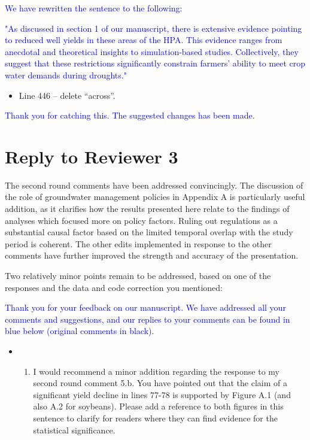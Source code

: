 \documentclass[
]{article}
\providecommand{\tightlist}{%
  \setlength{\itemsep}{0pt}\setlength{\parskip}{0pt}}
\begin{document}
\textcolor{blue}{We have rewritten the sentence to the following:}

\textcolor{blue}{"As discussed in section 1 of our manuscript, there is extensive evidence pointing to reduced well yields in these areas of the HPA. This evidence ranges from anecdotal and theoretical insights to simulation-based studies. Collectively, they suggest that these restrictions significantly constrain farmers' ability to meet crop water demands during droughts."}

\begin{itemize}
\tightlist
\item
  Line 446 -- delete ``across''.
\end{itemize}

\textcolor{blue}{Thank you for catching this. The suggested changes has been made.}

\hypertarget{reply-to-reviewer-3}{%
\section{Reply to Reviewer 3}\label{reply-to-reviewer-3}}

The second round comments have been addressed convincingly. The
discussion of the role of groundwater management policies in Appendix A
is particularly useful addition, as it clarifies how the results
presented here relate to the findings of analyses which focused more on
policy factors. Ruling out regulations as a substantial causal factor
based on the limited temporal overlap with the study period is coherent.
The other edits implemented in response to the other comments have
further improved the strength and accuracy of the presentation.

Two relatively minor points remain to be addressed, based on one of the
responses and the data and code correction you mentioned:

\textcolor{blue}{Thank you for your feedback on our manuscript. We have addressed all your comments and suggestions, and our replies to your comments can be found in blue below (original comments in black).}

\begin{itemize}
\item
  \begin{enumerate}
  \def\labelenumi{(\arabic{enumi})}
  \tightlist
  \item
    I would recommend a minor addition regarding the response to my
    second round comment 5.b. You have pointed out that the claim of a
    significant yield decline in lines 77-78 is supported by Figure A.1
    (and also A.2 for soybeans). Please add a reference to both figures
    in this sentence to clarify for readers where they can find evidence
    for the statistical significance.
  \end{enumerate}
\end{itemize}
\end{document}
